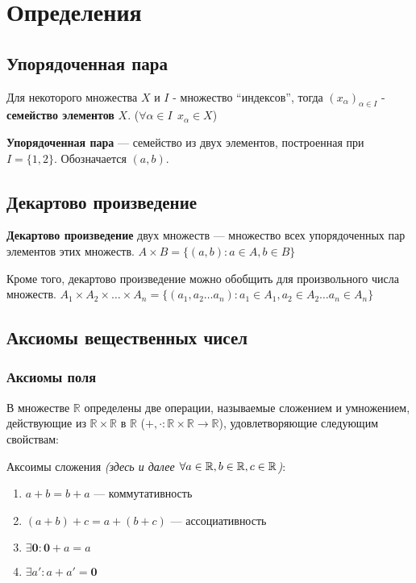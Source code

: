 

\usepackage{bm}
\usepackage{xcolor}

\cfoot{}
\rfoot{}

\setlength\parindent{0pt}


\section{Определения}
\subsection{Упорядоченная пара}
Для некоторого множества $X$ и $I$ - множество ``индексов'', тогда $(x_\alpha)_{\alpha\in I}$ - \textbf{семейство элементов} $X$. ($\forall \alpha\in I \ \ x_\alpha \in X$)

\textbf{Упорядоченная пара} --- семейство из двух элементов, построенная при $I=\{1, 2\}$. Обозначается $(a, b)$.
\subsection{Декартово произведение}
\textbf{Декартово произведение} двух множеств --- множество всех упорядоченных пар элементов этих множеств. $A\times B=\{(a,b): a\in A, b\in B\}$

Кроме того, декартово произведение можно обобщить для произвольного числа множеств. $A_1\times A_2\times\ldots\times A_n = \{(a_1,a_2\ldots a_n) : a_1\in A_1, a_2\in A_2\ldots a_n\in A_n\}$

\subsection{Аксиомы вещественных чисел}
\subsubsection{Аксиомы поля}
В множестве $\mathbb{R}$ определены две операции, называемые сложением и умножением, действующие из $\mathbb{R}\times\mathbb{R}$ в $\mathbb{R}$ ($+,\cdot:\mathbb{R}\times\mathbb{R} \rightarrow \mathbb{R}$), удовлетворяющие следующим свойствам:

Аксоимы сложения \textit{(здесь и далее $\forall a\in \operatorname*{\mathbb{R}}, b\in \operatorname*{\mathbb{R}}, c\in \operatorname*{\mathbb{R}}$)}:
\begin{enumerate}
    \itemsep0em
    \item $a+b=b+a$ --- коммутативность
    \item $(a+b)+c=a+(b+c)$ --- ассоциативность
    \item $\exists \bm{0}: \bm0+a=a$
    \item $\exists a': a+a'=\bm 0$
\end{enumerate}

